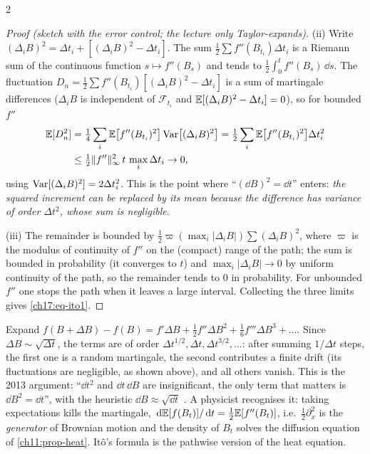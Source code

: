 \begin{paracol}{2}
\begin{proof}[Proof (sketch with the error control; the lecture only Taylor-expands)]
(ii) Write $(\Delta_iB)^2=\Delta t_i+[(\Delta_iB)^2-\Delta t_i]$. The sum $\tfrac12\sum f''(B_{t_i})\Delta t_i$ is a Riemann sum of the
continuous function $s\mapsto f''(B_s)$ and tends to $\tfrac12\int_0^tf''(B_s)\,\dd s$. The fluctuation $D_n=\tfrac12\sum f''(B_{t_i})[(\Delta_iB)^2-\Delta t_i]$ is a sum of martingale differences ($\Delta_iB$ is independent of $\mathcal F_{t_i}$ and
$\mathbb{E}[(\Delta_iB)^2-\Delta t_i]=0$), so for bounded $f''$
\begin{align*}
\mathbb{E}[D_n^2]&=\tfrac14\sum_i\mathbb{E}\bigl[f''(B_{t_i})^2\bigr]\operatorname{Var}\bigl[(\Delta_iB)^2\bigr]=\tfrac12\sum_i\mathbb{E}\bigl[f''(B_{t_i})^2\bigr]\Delta t_i^2\\
&\le\tfrac12\|f''\|_\infty^2\,t\,\max_i\Delta t_i\to0 ,
\end{align*}
using $\operatorname{Var}[(\Delta_iB)^2]=2\Delta t_i^2$. This is the point where ``$(\dd B)^2=\dd t$'' enters: \emph{the squared increment can be replaced by its mean because the difference has variance of order $\Delta t^2$, whose sum
is negligible}.

(iii) The remainder is bounded by $\tfrac12\varpi(\max_i|\Delta_iB|)\sum(\Delta_iB)^2$, where $\varpi$ is the modulus of continuity of $f''$ on the (compact) range of the path; the sum is bounded
in probability (it converges to $t$) and $\max_i|\Delta_iB|\to0$ by uniform continuity of the path, so the remainder tends to $0$ in probability. For unbounded $f''$ one stops the path when it leaves a large interval.
Collecting the three limits gives \eqref{ch17:eq-ito1}.
\end{proof}

\begin{intuition}
Expand $f(B+\Delta B)-f(B)=f'\Delta B+\tfrac12f''\Delta B^2+\tfrac16f'''\Delta B^3+\dots$. Since $\Delta B\sim\sqrt{\Delta t}$, the terms are
of order $\Delta t^{1/2},\Delta t,\Delta t^{3/2},\dots$: after summing $1/\Delta t$ steps, the first one is a random martingale, the second contributes a finite drift (its fluctuations are
negligible, as shown above), and all others vanish. This is the 2013 argument: ``$\dd t^2$ and $\dd t\,\dd B$ are insignificant, the only term that matters is $\dd B^2=\dd t$'', with the
heuristic $\dd B\approx\sqrt{\dd t}$ . A physicist recognises it: taking expectations kills the martingale,
$\,\mathrm{d}\mathbb{E}[f(B_t)]/\,\mathrm{d} t=\tfrac12\mathbb{E}[f''(B_t)]$, i.e.\ $\tfrac12\partial_x^2$ is the \emph{generator} of Brownian motion and the density of $B_t$ solves the diffusion equation
of \cref{ch11:prop-heat}. It\^o's formula is the pathwise version of the heat equation.
\end{intuition}


\end{paracol}

